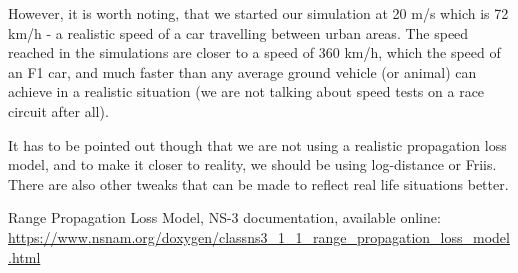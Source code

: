 \documentclass[11pt,journal]{article}
\begin{document}
	However, it is worth noting, that we started our simulation at 20 m/s which is 72 km/h - a realistic speed of a car travelling between urban areas. The speed reached in the simulations are closer to a speed of 360 km/h, which the speed of an F1 car, and much faster than any average ground vehicle (or animal) can achieve in a realistic situation (we are not talking about speed tests on a race circuit after all).
	
	It has to be pointed out though that we are not using a realistic propagation loss model, and to make it closer to reality, we should be using log-distance or Friis. There are also other tweaks that can be made to reflect real life situations better.
	
	\pagebreak
	\begin{thebibliography}{1}
		Range Propagation Loss Model, NS-3 documentation, available online: \url{https://www.nsnam.org/doxygen/classns3_1_1_range_propagation_loss_model.html}
	\end{thebibliography}
\end{document}

